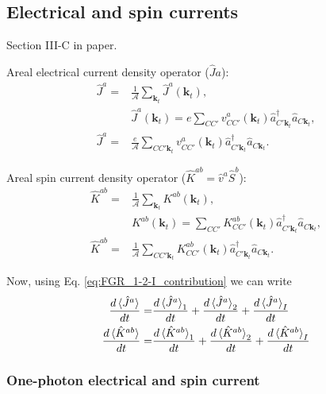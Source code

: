 \documentclass{article}
\newcommand{\kt}{\mathbf{k}_{t}}
\begin{document}
\subsection{Electrical and spin currents}
{\small Section III-C in paper. \\}

Areal electrical current density operator ($\hat{J}{a}$):
\begin{equation}
\begin{split}
\hat{J}^{a} =& \frac{1}{\mathcal{A}} \sum_{\kt} \hat{J}^{a}(\kt) , \\
& \hat{J}^{a}(\kt) = e \sum_{CC'} v^{a}_{CC'}(\kt) \hat{a}^{\dag}_{C'\kt}
\hat{a}_{C\kt} , \\
\hat{J}^{a} =& \frac{e}{\mathcal{A}} \sum_{CC'\kt} v^{a}_{CC'}(\kt) 
\hat{a}^{\dag}_{C'\kt}\hat{a}_{C\kt} .
\end{split}
\end{equation}


Areal spin current density operator ($\hat{K}^{ab}=\hat{v}^{a}\hat{S}^{b}$): 
\begin{equation}
\begin{split}
\hat{K}^{ab} =& \frac{1}{\mathcal{A}} \sum_{\kt} K^{ab}(\kt) , \\
& K^{ab}(\kt) = \sum_{CC'} K^{ab}_{CC'}(\kt)\hat{a}^{\dag}_{C'\kt} 
\hat{a}_{C\kt} , \\
\hat{K}^{ab} =& \frac{1}{\mathcal{A}} \sum_{CC'\kt} K^{ab}_{CC'}(\kt) 
\hat{a}^{\dag}_{C'\kt} \hat{a}_{C\kt} .
\end{split}
\end{equation}

Now, using Eq. \eqref{eq:FGR_1-2-I_contribution} we can write 
\begin{equation*}
\begin{split}
\frac{d\ev*{\hat{J}^{a}}}{dt} =& \frac{d\ev*{\hat{J}^{a}}_{1}}{dt} + 
\frac{d\ev*{\hat{J}^{a}}_{2}}{dt} + \frac{d\ev*{\hat{J}^{a}}_{I}}{dt}  \\
\frac{d\ev*{\hat{K}^{ab}}}{dt} =& \frac{d\ev*{\hat{K}^{ab}}_{1}}{dt} + 
\frac{d\ev*{\hat{K}^{ab}}_{2}}{dt} + \frac{d\ev*{\hat{K}^{ab}}_{I}}{dt}  
\end{split}
\end{equation*}

\subsubsection{One-photon electrical and spin current}
\end{document}
